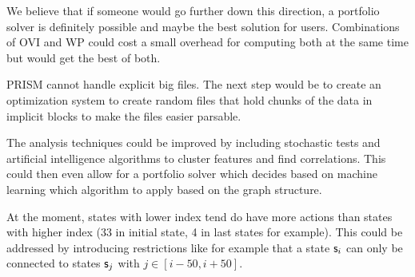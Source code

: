 We believe that if someone would go further down this direction, a portfolio solver is definitely possible and maybe the best solution for users.
Combinations of OVI and WP could cost a small overhead for computing both at the same time but would get the best of both.

PRISM cannot handle explicit big files.
The next step would be to create an optimization system to create random files that hold chunks of the data in implicit blocks to make the files easier parsable.

The analysis techniques could be improved by including stochastic tests and artificial intelligence algorithms to cluster features and find correlations.
This could then even allow for a portfolio solver which decides based on machine learning which algorithm to apply based on the graph structure.

At the moment, states with lower index tend do have more actions than states with higher index (33 in initial state, 4 in last states for example).
This could be addressed by introducing restrictions like for example that a state $\mathsf{s}_i$ can only be connected to states $\mathsf{s}_{j}$ with $j \in [i-50, i+50]$.